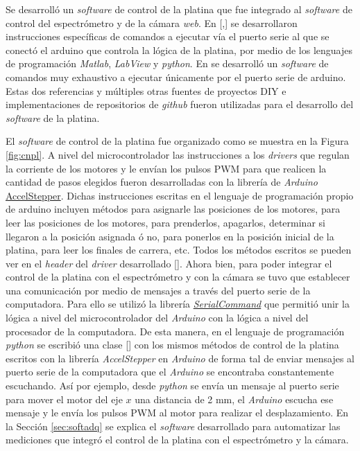 \hspace{0.5cm}Se desarrolló un \textit{software} de control de la platina que fue integrado al \textit{software} de control del espectrómetro y de la cámara \textit{web}. En [\cite{campbells},\href{https://github.com/raacampbell/openstage/tree/master/serialInterfaceScripts}{\faGithub}] se desarrollaron instrucciones específicas de comandos a ejecutar vía el puerto serie al que se conectó el arduino que controla la lógica de la platina, por medio de los lenguajes de programación \textit{Matlab}, \textit{LabView} y \textit{python}. En \href{https://forum.arduino.cc/index.php?topic=469343}{\faCode} se desarrolló un \textit{software} de comandos muy exhaustivo a ejecutar únicamente por el puerto serie de arduino. Estas dos referencias y múltiples otras fuentes de proyectos DIY e implementaciones de repositorios de \textit{github} fueron utilizadas para el desarrollo del \textit{software} de la platina.

El \textit{software} de control de la platina fue organizado como se muestra en la Figura \ref{fig:cnpl}. A nivel del microcontrolador las instrucciones a los \textit{drivers} que regulan la corriente de los motores y le envían los pulsos PWM para que realicen la cantidad de pasos elegidos fueron desarrolladas con la librería de \textit{Arduino} \href{https://www.airspayce.com/mikem/arduino/AccelStepper/}{AccelStepper}. Dichas instrucciones escritas en el lenguaje de programación propio de arduino incluyen métodos para asignarle las posiciones de los motores, para leer las posiciones de los motores, para prenderlos, apagarlos, determinar si llegaron a la posición asignada ó no, para ponerlos en la posición inicial de la platina, para leer los finales de carrera, etc. Todos los métodos escritos se pueden ver en el \textit{header} del \textit{driver} desarrollado [\href{https://github.com/jrr1984/open_frame_XYStage/tree/master/ino_main}{\faGithub}].
Ahora bien, para poder integrar el control de la platina con el espectrómetro y con la cámara se tuvo que establecer una comunicación por medio de mensajes a través del puerto serie de la computadora. Para ello se utilizó la librería \href{https://github.com/kroimon/Arduino-SerialCommand}{\textit{SerialCommand}} que permitió unir la lógica a nivel del microcontrolador del \textit{Arduino} con la lógica a nivel del procesador de la computadora. De esta manera, en el lenguaje de programación \textit{python} se escribió una clase [\href{https://github.com/jrr1984/open\_frame\_XYStage/blob/master/XYStage.py}{\faGithub}] con los mismos métodos de control de la platina escritos con la librería \textit{AccelStepper} en \textit{Arduino} de forma tal de enviar mensajes al puerto serie de la computadora que el \textit{Arduino} se encontraba constantemente escuchando. Así por ejemplo, desde \textit{python} se envía un mensaje al puerto serie para mover el motor del eje $\textit{x}$ una distancia de 2 mm, el \textit{Arduino} escucha ese mensaje y le envía los pulsos PWM al motor para realizar el desplazamiento. En la Sección \ref{sec:softadq} se explica el \textit{software} desarrollado para automatizar las mediciones que integró el control de la platina con el espectrómetro y la cámara.


